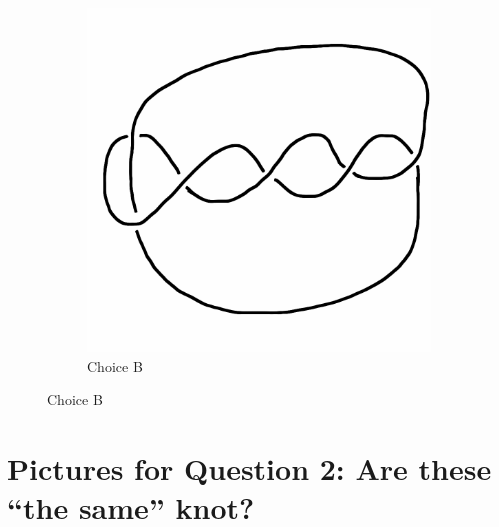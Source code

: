\documentclass[12pt,letterpaper]{article}
\theoremstyle{definition}
\begin{document}
\begin{figure}[h!]
\begin{subfigure}[b]{0.4\textwidth}
        \includegraphics[width=\textwidth]{meeting06pics/9SeptQ1b.png}
        \caption{Choice B}
    \end{subfigure}
\end{figure}

\section*{Pictures for Question 2: Are these ``the same'' knot?}
\end{document}
